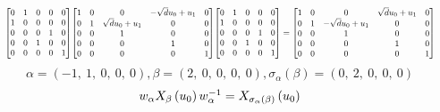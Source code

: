 \documentclass[11pt]{article}
\theoremstyle{definition}
\begin{document}
\[
\scaletoalign{\textwidth}{{\left[\begin{matrix}0 & 1 & 0 & 0 & 0\\1 & 0 & 0 & 0 & 0\\0 & 0 & 0 & 1 & 0\\0 & 0 & 1 & 0 & 0\\0 & 0 & 0 & 0 & 1\end{matrix}\right]} {\left[\begin{matrix}1 & 0 & 0 & - \sqrt{d} u_{0} + u_{1} & 0\\0 & 1 & \sqrt{d} u_{0} + u_{1} & 0 & 0\\0 & 0 & 1 & 0 & 0\\0 & 0 & 0 & 1 & 0\\0 & 0 & 0 & 0 & 1\end{matrix}\right]} {\left[\begin{matrix}0 & 1 & 0 & 0 & 0\\1 & 0 & 0 & 0 & 0\\0 & 0 & 0 & 1 & 0\\0 & 0 & 1 & 0 & 0\\0 & 0 & 0 & 0 & 1\end{matrix}\right]} = {\left[\begin{matrix}1 & 0 & 0 & \sqrt{d} u_{0} + u_{1} & 0\\0 & 1 & - \sqrt{d} u_{0} + u_{1} & 0 & 0\\0 & 0 & 1 & 0 & 0\\0 & 0 & 0 & 1 & 0\\0 & 0 & 0 & 0 & 1\end{matrix}\right]}}
\]
\[
\alpha = \left( -1, \  1, \  0, \  0, \  0\right), \beta = \left( 2, \  0, \  0, \  0, \  0\right), \sigma_{\alpha}(\beta) = \left( 0, \  2, \  0, \  0, \  0\right)
\]
\[
\scaletoalign{\textwidth}{w_{\alpha} X_{\beta}\left(u_{0}\right) w_{\alpha}^{-1} = X_{\sigma_{\alpha}\left(\beta\right)}\left(u_{0}\right)}
\]
\end{document}

